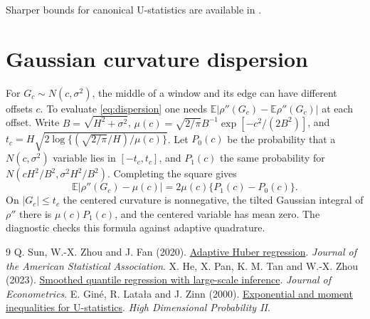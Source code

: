 \documentclass[11pt]{article}
\newcommand{\E}{\mathbb E}
\theoremstyle{remark}
\begin{document}
Sharper bounds for canonical U-statistics are available in \cite{glz}.

\section{Gaussian curvature dispersion}\label{app:gauss}
For \(G_c\sim N(c,\sigma^2)\), the middle of a window and its edge
can have different offsets \(c\). To evaluate \eqref{eq:dispersion}
one needs \(\E|\rho''(G_c)-\E\rho''(G_c)|\) at each offset.
Write
\(B=\sqrt{H^2+\sigma^2}\),
\(\mu(c)=\sqrt{2/\pi}B^{-1}\exp[-c^2/(2B^2)]\), and
\(t_c=H\sqrt{2\log\{(\sqrt{2/\pi}/H)/\mu(c)\}}\).
Let \(P_0(c)\) be the probability that a \(N(c,\sigma^2)\) variable lies
in \([-t_c,t_c]\), and \(P_1(c)\) the same probability for
\(N(cH^2/B^2,\sigma^2H^2/B^2)\). Completing the square gives
\[
 \E|\rho''(G_c)-\mu(c)|
       =2\mu(c)\{P_1(c)-P_0(c)\}.
\]
On \(|G_c|\le t_c\) the centered curvature is nonnegative,
the tilted Gaussian integral of \(\rho''\) there is \(\mu(c)P_1(c)\),
and the centered variable has mean zero. The diagnostic checks this
formula against adaptive quadrature.

\begin{thebibliography}{9}
Q. Sun, W.-X. Zhou and J. Fan (2020).
\href{https://doi.org/10.1080/01621459.2018.1543124}{Adaptive Huber regression}.
\emph{Journal of the American Statistical Association}.
X. He, X. Pan, K. M. Tan and W.-X. Zhou (2023).
\href{https://arxiv.org/abs/2012.05187}{Smoothed quantile regression with large-scale inference}.
\emph{Journal of Econometrics}.
E. Gin\'e, R. Lata{\l}a and J. Zinn (2000).
\href{https://arxiv.org/abs/math/0003228}{Exponential and moment inequalities for U-statistics}.
\emph{High Dimensional Probability II}.
\end{thebibliography}
\end{document}
